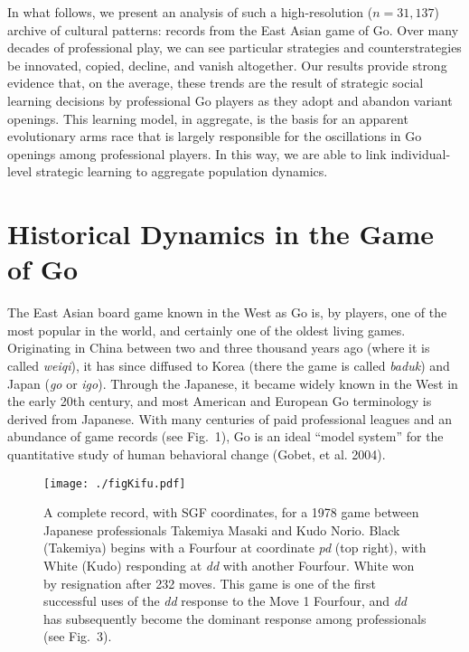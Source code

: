 \documentclass{article}
\begin{document}
In what follows, we present an analysis of such a high-resolution ($n=31,137$) archive of cultural patterns: records from the East Asian game of Go.  Over many decades of professional play, we can see particular strategies and counterstrategies be innovated, copied, decline, and vanish altogether.  Our results provide strong evidence that, on the average, these trends are the result of strategic social learning decisions by professional Go players as they adopt and abandon variant openings.  This learning model, in aggregate, is the basis for an apparent evolutionary arms race that is largely responsible for the oscillations in Go openings among professional players.  In this way, we are able to link individual-level strategic learning to aggregate population dynamics.

\section{Historical Dynamics in the Game of Go}

The East Asian board game known in the West as Go is, by players, one of the most popular in the world, and certainly one of the oldest living games.  Originating in China between two and three thousand years ago (where it is called \textit{weiqi}), it has since diffused to Korea (there the game is called \textit{baduk}) and Japan (\textit{go} or \textit{igo}).  Through the Japanese, it became widely known in the West in the early 20th century, and most American and European Go terminology is derived from Japanese.  With many centuries of paid professional leagues and an abundance of game records (see Fig.~1), Go is an ideal ``model system'' for the quantitative study of human behavioral change (Gobet, et al. 2004). 

\begin{figure}[t]
\begin{center} 
\texttt{[image: ./figKifu.pdf]}
\caption{A complete record, with SGF coordinates, for a 1978 game between Japanese professionals Takemiya Masaki and Kudo Norio.  Black (Takemiya) begins with a Fourfour at coordinate \textit{pd} (top right), with White (Kudo) responding at \textit{dd} with another Fourfour.  White won by resignation after 232 moves.  This game is one of the first successful uses of the \textit{dd} response to the Move 1 Fourfour, and \textit{dd} has subsequently become the dominant response among professionals (see Fig.~3).}
\label{FigKifu}
\end{center}
\end{figure}
\end{document}
